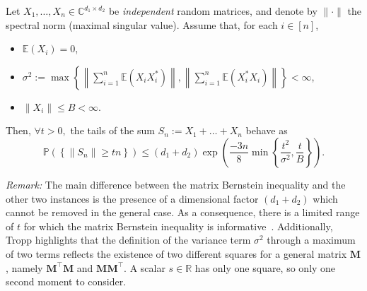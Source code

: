 \begin{lemma}\label{lem:matrix_bern}
    Let $X_1, \dots, X_n \in \mathbb{C}^{d_1 \times d_2}$ be \textit{independent} random matrices, and denote by $\| \cdot \|$ the spectral norm (maximal singular value). Assume that, for each $i \in [n]$,
    \begin{itemize}
        \item $\mathbb{E} \left ( X_i \right ) = 0$,
        \item $\sigma^2 := \max \left \{ \left \| \sum_{i=1}^{n} \mathbb{E} \left ( X_i X_i^* \right )\right \|, \left \| \sum_{i=1}^{n} \mathbb{E} \left ( X_i^* X_i \right )\right \| \right \} < \infty$,
        \item $ \| X_i \| \leq B < \infty$.
    \end{itemize}
    Then, $\forall t > 0,$ the tails of the sum $S_n := X_1 + \dots + X_n$ behave as
    \begin{equation}
        \mathbb{P} \left ( \left \{  \| S_n \| \geq t n \right \}\right ) \leq (d_1 + d_2) \exp \left( \frac{-3 n}{8} \min \left \{ \frac{t^2}{\sigma^2}, \frac{t}{B} \right \} \right).
    \end{equation}
\end{lemma}

\emph{Remark:} The main difference between the matrix Bernstein inequality and the other two instances is the presence of a dimensional factor $(d_1 + d_2)$ which cannot be removed in the general case. As a consequence, there is a limited range of $t$ for which the matrix Bernstein inequality is informative~\cite[p. 77]{tropp2015b}. Additionally, Tropp highlights that the definition of the variance term $\sigma^2$ through a maximum of two terms reflects the existence of two different squares for a general matrix $\mathbf{M}$, namely $\mathbf{M}^\top \mathbf{M}$ and $\mathbf{M} \mathbf{M}^\top$. A scalar $s \in \mathbb{R}$ has only one square, so only one second moment to consider.